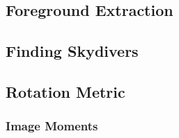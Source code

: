 \documentclass[a4paper, 12pt]{article}
\begin{document}
	\subsection{Foreground Extraction}
	\subsection{Finding Skydivers}
	\subsection{Rotation Metric}
		\subsubsection{Image Moments}
\end{document}
